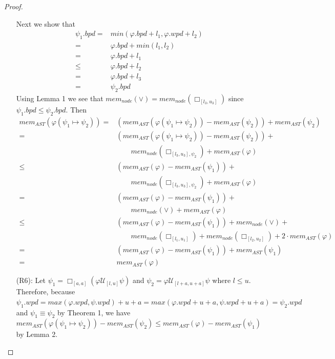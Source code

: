 \documentclass{article}
\begin{document}
\begin{proof}
\begin{enumerate}
Next we show that 
\begin{align*}
\psi_1.bpd = & min(\varphi.bpd + l_1, \varphi.wpd + l_2) \\
= & \varphi.bpd + min(l_1, l_2) \\
= & \varphi.bpd + l_1 \\
\leq & \varphi.bpd + l_2 \\
= & \varphi.bpd + l_3 \\
= & \psi_2.bpd
\end{align*}
Using Lemma 1 we see that $mem_{node}(\lor) = mem_{node}(\Box_{[l_3,u_3]}{})$ since $\psi_1.bpd \leq \psi_2.bpd$. Then
\begin{align*}
mem_{AST}(\varphi(\psi_1 \mapsto \psi_2)) = & (mem_{AST}(\varphi(\psi_1 \mapsto \psi_2)) - mem_{AST}(\psi_2)) + mem_{AST}(\psi_2) \\
= & (mem_{AST}(\varphi(\psi_1 \mapsto \psi_2)) - mem_{AST}(\psi_2)) + \\
& \qquad mem_{node}(\Box_{[l_3,u_3],\psi_2}{}) + mem_{AST}(\varphi) \\
\leq & (mem_{AST}(\varphi) - mem_{AST}(\psi_1))  + \\
& \qquad mem_{node}(\Box_{[l_3,u_3],\psi_2}{}) + mem_{AST}(\varphi) \\
= & (mem_{AST}(\varphi) - mem_{AST}(\psi_1)) + \\
& \qquad mem_{node}(\lor) + mem_{AST}(\varphi) \\
\leq & (mem_{AST}(\varphi) - mem_{AST}(\psi_1)) + mem_{node}(\lor) + \\
& \qquad mem_{node}(\Box_{[l_1,u_1]}{}) + mem_{node}(\Box_{[l_2,u_2]}{}) + 2 \cdot mem_{AST}(\varphi) \\
= & (mem_{AST}(\varphi) - mem_{AST}(\psi_1)) + mem_{AST}(\psi_1) \\
= & mem_{AST}(\varphi)
\end{align*}

    \item[(R6):] Let $\psi_1 = \Box_{[a,a]}{({\varphi}\mathcal{U}_{[l,u]}{\psi})}$ and $\psi_2 = {\varphi}\mathcal{U}_{[l+a,u+a]}{\psi}$ where $l \leq u$.
Therefore, because $\psi_1.wpd = max(\varphi.wpd,\psi.wpd) + u+a = max(\varphi.wpd+u+a,\psi.wpd+u+a) = \psi_2.wpd$ and $\psi_1 \equiv \psi_2$ by Theorem 1, we have $mem_{AST}(\varphi(\psi_1 \mapsto \psi_2)) - mem_{AST}(\psi_2)  \leq mem_{AST}(\varphi) - mem_{AST}(\psi_1)$ by Lemma 2. 


\end{enumerate}
\end{proof}
\end{document}
